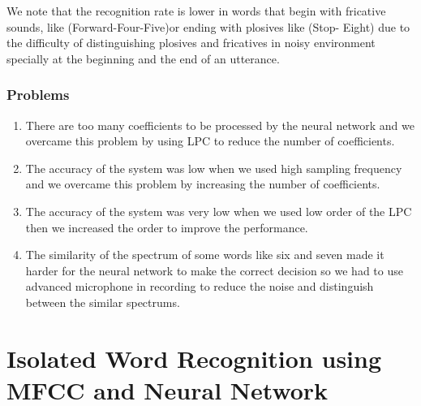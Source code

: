 \documentclass[12pt, a4paper, twoside]{report}
\begin{document}
We note that the recognition rate is lower in words that begin with fricative sounds, like (Forward-Four-Five)or ending with plosives like (Stop- Eight) due to the difficulty of distinguishing plosives and fricatives  in noisy environment specially at the beginning and the end of an utterance.

\subsubsection{Problems}
\begin{enumerate}
\item There are too many coefficients to be processed by the neural network and we overcame this problem by using LPC to reduce the number of coefficients.
\item The accuracy of the system was low when we used high sampling frequency and we overcame this problem by increasing the number of coefficients.
\item The accuracy of the system was very low when we used low order of the LPC then we increased the order to improve the performance.
\item The similarity of the spectrum of some words like six and seven made it harder for the neural network to make the correct decision so we had to use advanced microphone in recording to reduce the noise and distinguish between the similar spectrums.
\end{enumerate}

\section{Isolated Word Recognition using MFCC and Neural Network}
\end{document}
